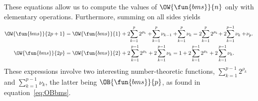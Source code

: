 These equations allow us to compute the values of
\(\OW{\fun{bms}}{n}\) only with elementary operations. Furthermore,
summing on all sides yields
\begin{align}
\OW{\fun{bms}}{2p+1}
 &= \OW{\fun{bms}}{1} + 2\!\sum_{k=1}^{p} 2^{\rho_k} +
    \!\sum_{k=1}^{p}\nu_{k-1} + \!\sum_{k=1}^p\nu_k
  = 2 \!\sum_{k=1}^{p} 2^{\rho_k}\! + 2\!\sum_{k=1}^{p-1}\nu_k +
    \!\nu_p.\label{eq:OWbms_2p_1}\\
\OW{\fun{bms}}{2p}
  &= \OW{\fun{bms}}{2} + 2\sum_{k=1}^{p-1}2^{\rho_k} +
2\sum_{k=1}^{p-1}\nu_k
  = 1 +  2\sum_{k=1}^{p-1}2^{\rho_k} + 2\sum_{k=1}^{p-1}\nu_k.
\label{eq:OWbms_2p}
\end{align}
These expressions involve two interesting number\hyp{}theoretic
functions, \(\sum_{k=1}^{p-1}2^{\rho_k}\) and
\(\sum_{k=1}^{p-1}\nu_k\), the latter being \(\OB{\fun{bms}}{p}\), as
found in equation~\eqref{eq:OBbms}.



